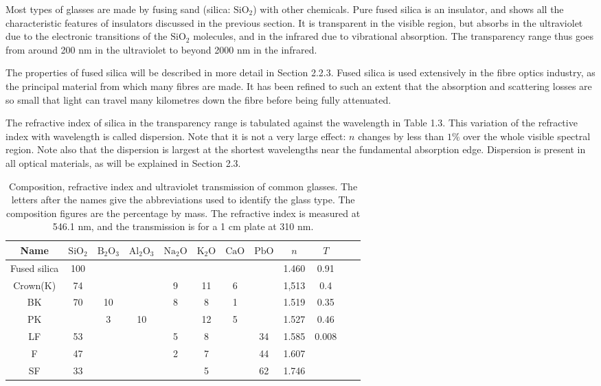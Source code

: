 \documentclass[12pt]{book}
\begin{document}
Most types of glasses are made by fusing sand (silica: $\mathrm{SiO_2}$) with other chemicals. Pure fused silica is an insulator, and shows all the characteristic features of insulators discussed in the previous section. It is transparent in the visible region, but absorbs in the ultraviolet due to the electronic transitions of the $\mathrm{SiO_2}$ molecules, and in the infrared due to vibrational absorption. The transparency range thus goes from around 200 nm in the ultraviolet to beyond 2000 nm in the infrared.

The properties of fused silica will be described in more detail in Section 2.2.3. Fused silica is used extensively in the fibre optics industry, as the principal material from which many fibres are made. It has been refined to such an extent that the absorption and scattering losses are so small that light can travel many kilometres down the fibre before being fully attenuated.

The refractive index of silica in the transparency range is tabulated against the wavelength in Table 1.3. This variation of the refractive index with wavelength is called dispersion. Note that it is not a very large effect: $n$ changes by less than $1\%$ over the whole visible spectral region. Note also that the dispersion is largest at the shortest wavelengths near the fundamental absorption edge. Dispersion is present in all optical materials, as will be explained in Section 2.3.

\begin{table}[htbp]\footnotesize
\caption{Composition, refractive index and ultraviolet transmission of common glasses. The letters after the names give the abbreviations used to identify the glass type. The composition figures are the percentage by mass. The refractive index is measured at 546.1 nm, and the transmission is for a 1 cm plate at 310 nm. }
\begin{tabular}{cccccccccccc}
\hline
Name & $\mathrm{SiO_2}$&$\mathrm{B_2O_3}$&$\mathrm{Al_2O_3}$&$\mathrm{Na_2O}$&$\mathrm{K_2O}$&$\mathrm{CaO}$&$\mathrm{PbO}$&$n$&$T$\\
\hline
Fused silica &100&&&&&&&1.460 &0.91\\
Crown(K)&74&&&9&11&6&&1,513&0.4\\
BK&70&10&&8&8&1&&1.519&0.35\\
PK&&3&10&&12&5&&1.527&0.46\\
LF&53&&&5&8&&34&1.585&0.008\\
F&47&&&2&7&&44&1.607&\\
SF&33&&&&5&&62&1.746&\\
\hline
\end{tabular}
\label{tab:1.1}
\end{table}%
\end{document}

